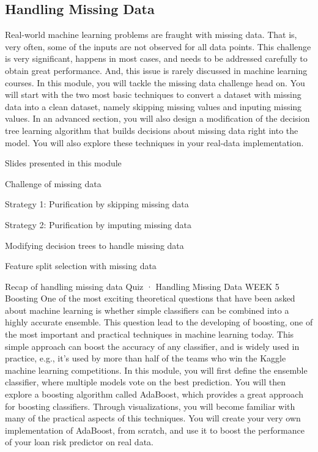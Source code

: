 \subsection{Handling Missing Data}
Real-world machine learning problems are fraught with missing data. That is, very often, some of the inputs are not observed for all data points. This challenge is very significant, happens in most cases, and needs to be addressed carefully to obtain great performance. And, this issue is rarely discussed in machine learning courses. In this module, you will tackle the missing data challenge head on. You will start with the two most basic techniques to convert a dataset with missing data into a clean dataset, namely skipping missing values and inputing missing values. In an advanced section, you will also design a modification of the decision tree learning algorithm that builds decisions about missing data right into the model. You will also explore these techniques in your real-data implementation.
\item Slides presented in this module
\item Challenge of missing data
\item Strategy 1: Purification by skipping missing data
\item Strategy 2: Purification by imputing missing data
\item Modifying decision trees to handle missing data
\item Feature split selection with missing data
\item Recap of handling missing data
Quiz · Handling Missing Data
WEEK 5
Boosting
One of the most exciting theoretical questions that have been asked about machine learning is whether simple classifiers can be combined into a highly accurate ensemble. This question lead to the developing of boosting, one of the most important and practical techniques in machine learning today. This simple approach can boost the accuracy of any classifier, and is widely used in practice, e.g., it's used by more than half of the teams who win the Kaggle machine learning competitions. In this module, you will first define the ensemble classifier, where multiple models vote on the best prediction. You will then explore a boosting algorithm called AdaBoost, which provides a great approach for boosting classifiers. Through visualizations, you will become familiar with many of the practical aspects of this techniques. You will create your very own implementation of AdaBoost, from scratch, and use it to boost the performance of your loan risk predictor on real data.

